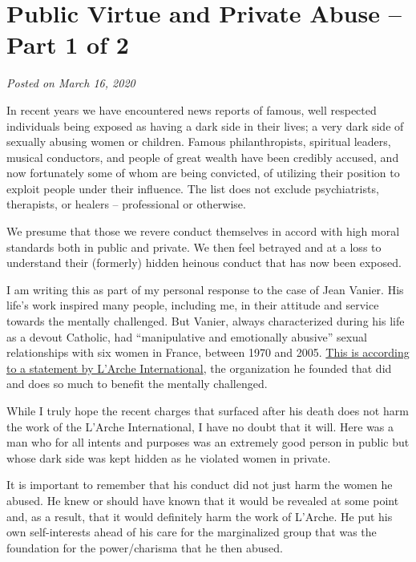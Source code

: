 \documentclass[]{book}
\begin{document}
\hypertarget{public-virtue-and-private-abuse-part-1-of-2}{%
\section{Public Virtue and Private Abuse -- Part 1 of 2}\label{public-virtue-and-private-abuse-part-1-of-2}}

\emph{Posted on March 16, 2020}

In recent years we have encountered news reports of famous, well respected individuals being exposed as having a dark side in their lives; a very dark side of sexually abusing women or children. Famous philanthropists, spiritual leaders, musical conductors, and people of great wealth have been credibly accused, and now fortunately some of whom are being convicted, of utilizing their position to exploit people under their influence. The list does not exclude psychiatrists, therapists, or healers -- professional or otherwise.

We presume that those we revere conduct themselves in accord with high moral standards both in public and private. We then feel betrayed and at a loss to understand their (formerly) hidden heinous conduct that has now been exposed.

I am writing this as part of my personal response to the case of Jean Vanier. His life's work inspired many people, including me, in their attitude and service towards the mentally challenged. But Vanier, always characterized during his life as a devout Catholic, had ``manipulative and emotionally abusive'' sexual relationships with six women in France, between 1970 and 2005. \href{https://www.bbc.com/news/world-51596516}{This is according to a statement by L'Arche International}, the organization he founded that did and does so much to benefit the mentally challenged.

While I truly hope the recent charges that surfaced after his death does not harm the work of the L'Arche International, I have no doubt that it will. Here was a man who for all intents and purposes was an extremely good person in public but whose dark side was kept hidden as he violated women in private.

It is important to remember that his conduct did not just harm the women he abused. He knew or should have known that it would be revealed at some point and, as a result, that it would definitely harm the work of L'Arche. He put his own self-interests ahead of his care for the marginalized group that was the foundation for the power/charisma that he then abused.
\end{document}
